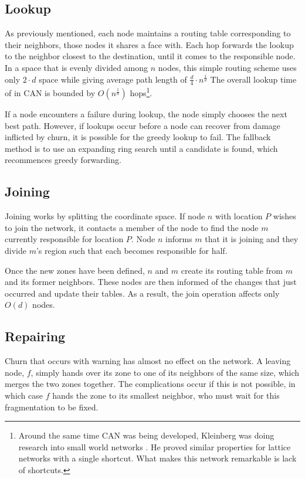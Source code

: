 \documentclass[10pt,letterpaper]{report}
\begin{document}
\subsection*{Lookup}
As previously mentioned, each node maintains a routing table corresponding to their neighbors, those nodes it shares a face with.
Each hop forwards the lookup to the neighbor closest to the destination, until it comes to the responsible node.
In a space that is evenly divided among $n$ nodes, this simple routing scheme uses only $2 \cdot d$ space while giving average path length of $\frac{d}{4}\cdot n^{\frac{1}{d}}$
The overall lookup time of in CAN is bounded by $O(n^{\frac{1}{d}})$ hops\footnote{Around the same time CAN was being developed, Kleinberg was doing research into small world networks \cite{kleinberg2000small}.  He proved similar properties for lattice networks with a single shortcut.  What makes this network remarkable is lack of shortcuts.}.

If a node encounters a failure during lookup, the node simply chooses the next best path.
However, if lookups occur before a node can recover from damage inflicted by churn, it is possible for the greedy lookup to fail.
The fallback method is to use an expanding ring search until a candidate is found, which recommences greedy forwarding.

\subsection*{Joining}
Joining works by splitting the coordinate space.  
If node $n$ with location $P$ wishes to join the network, it contacts a member of the node to find the node $m$ currently responsible for location $P$.
Node $n$ informs $m$ that it is joining and they divide $m$'s region such that each becomes responsible for half.


Once the new zones have been defined, $n$ and $m$ create its routing table from $m$ and its former neighbors.
These nodes are then informed of the changes that just occurred and update their tables.
As a result, the join operation affects only $O(d)$ nodes.  



\subsection*{Repairing}

Churn that occurs with warning has almost no effect on the network.
A leaving node, $f$, simply hands over its zone to one of its neighbors of the same size, which merges the two zones together.
The complications occur if this is not possible, in which case  $f$ hands the zone to its smallest neighbor, who must wait for this fragmentation to be fixed.
\end{document}
